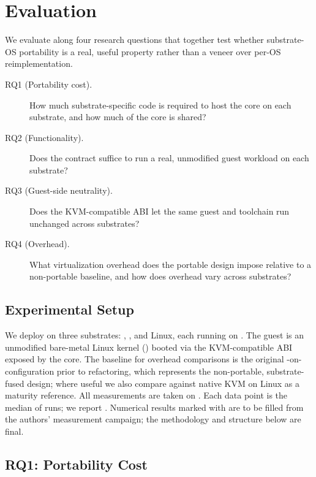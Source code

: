 \section{Evaluation}
\label{sec:evaluation}

We evaluate \axvisor{} along four research questions that together test whether
substrate-OS portability is a real, useful property rather than a veneer over
per-OS reimplementation.

\begin{description}
  \item[RQ1 (Portability cost).] How much substrate-specific code is required to
  host the \axvisor{} core on each substrate, and how much of the core is
  shared?
  \item[RQ2 (Functionality).] Does the contract suffice to run a real,
  unmodified guest workload on each substrate?
  \item[RQ3 (Guest-side neutrality).] Does the KVM-compatible ABI let the same
  guest and toolchain run unchanged across substrates?
  \item[RQ4 (Overhead).] What virtualization overhead does the portable design
  impose relative to a non-portable baseline, and how does overhead vary across
  substrates?
\end{description}

\subsection{Experimental Setup}

We deploy \axvisor{} on three substrates: \arceos{}, \asterinas{}, and Linux,
each running on . The guest is an unmodified bare-metal Linux kernel
() booted via the KVM-compatible ABI exposed by the core. The
baseline for overhead comparisons is the original \axvisor{}-on-\arceos{}
configuration prior to refactoring, which represents the non-portable,
substrate-fused design; where useful we also compare against native KVM on Linux
as a maturity reference. All measurements are taken on . Each data point is the median of  runs; we report
. Numerical results marked with \fillme{} are to
be filled from the authors' measurement campaign; the methodology and structure
below are final.

\subsection{RQ1: Portability Cost}


